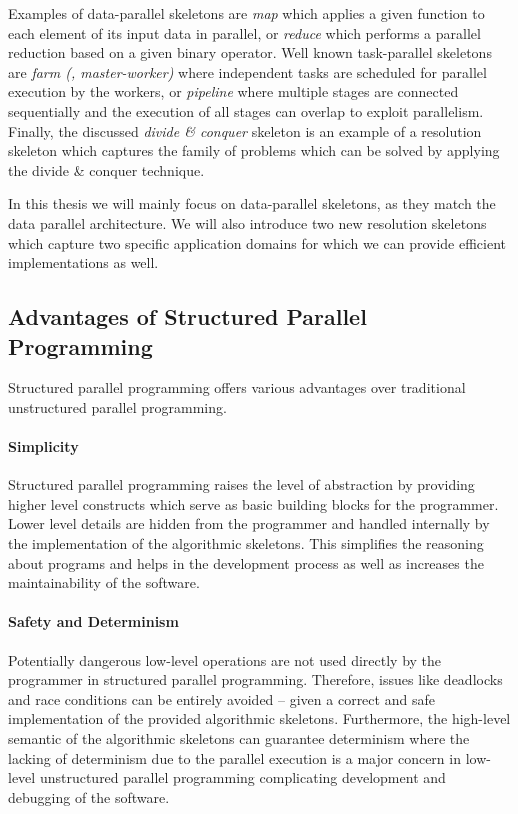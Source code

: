 Examples of data-parallel skeletons are \emph{map} which applies a given function to each element of its input data in parallel, or \emph{reduce} which performs a parallel reduction based on a given binary operator.
Well known task-parallel skeletons are \emph{farm (\aka, master-worker)} where independent tasks are scheduled for parallel execution by the workers, or \emph{pipeline} where multiple stages are connected sequentially and the execution of all stages can overlap to exploit parallelism.
Finally, the discussed \emph{divide \& conquer} skeleton is an example of a resolution skeleton which captures the family of problems which can be solved by applying the divide \& conquer technique.

In this thesis we will mainly focus on data-parallel skeletons, as they match the data parallel \GPU architecture.
We will also introduce two new resolution skeletons which capture two specific application domains for which we can provide efficient \GPU implementations as well.

\subsection{Advantages of Structured Parallel Programming}
Structured parallel programming offers various advantages over traditional unstructured parallel programming.

\paragraph{Simplicity}
Structured parallel programming raises the level of abstraction by providing higher level constructs which serve as basic building blocks for the programmer.
Lower level details are hidden from the programmer and handled internally by the implementation of the algorithmic skeletons.
This simplifies the reasoning about programs and helps in the development process as well as increases the maintainability of the software.

\paragraph{Safety and Determinism}
Potentially dangerous low-level operations are not used directly by the programmer in structured parallel programming.
Therefore, issues like deadlocks and race conditions can be entirely avoided -- given a correct and safe implementation of the provided algorithmic skeletons.
Furthermore, the high-level semantic of the algorithmic skeletons can guarantee determinism where the lacking of determinism due to the parallel execution is a major concern in low-level unstructured parallel programming complicating development and debugging of the software.

